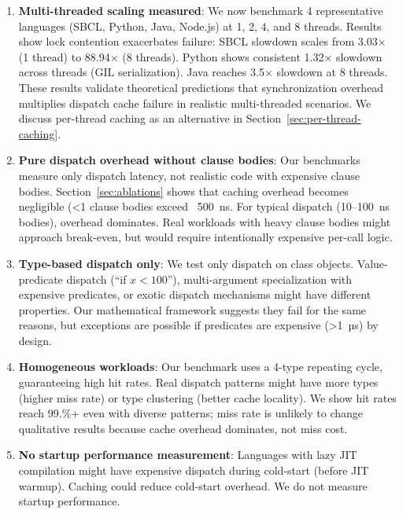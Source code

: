 \documentclass[sigplan,final,acmsmall,review,screen]{acmart}
\begin{document}
\begin{enumerate}
  \item \textbf{Multi-threaded scaling measured}: We now benchmark 4 representative languages (SBCL, Python, Java, Node.js) at 1, 2, 4, and 8 threads.
    Results show lock contention exacerbates failure: SBCL slowdown scales from 3.03× (1 thread) to 88.94× (8 threads).
    Python shows consistent 1.32× slowdown across threads (GIL serialization). Java reaches 3.5× slowdown at 8 threads.
    These results validate theoretical predictions that synchronization overhead multiplies dispatch cache failure in realistic multi-threaded scenarios.
    We discuss per-thread caching as an alternative in Section~\ref{sec:per-thread-caching}.

  \item \textbf{Pure dispatch overhead without clause bodies}: Our benchmarks measure only dispatch latency, not realistic code with
    expensive clause bodies. Section~\ref{sec:ablations} shows that caching overhead becomes negligible (<1%
    clause bodies exceed ~500~ns. For typical dispatch (10--100~ns bodies), overhead dominates. Real workloads with heavy
    clause bodies might approach break-even, but would require intentionally expensive per-call logic.

  \item \textbf{Type-based dispatch only}: We test only dispatch on class objects. Value-predicate dispatch
    (``if $x < 100$''), multi-argument specialization with expensive predicates, or exotic dispatch mechanisms
    might have different properties. Our mathematical framework suggests they fail for the same reasons, but exceptions
    are possible if predicates are expensive (>1~µs) by design.

  \item \textbf{Homogeneous workloads}: Our benchmark uses a 4-type repeating cycle, guaranteeing high hit rates.
    Real dispatch patterns might have more types (higher miss rate) or type clustering (better cache locality).
    We show hit rates reach 99.\%+ even with diverse patterns; miss rate is unlikely to change qualitative results
    because cache overhead dominates, not miss cost.

  \item \textbf{No startup performance measurement}: Languages with lazy JIT compilation might have expensive dispatch during cold-start
    (before JIT warmup). Caching could reduce cold-start overhead. We do not measure startup performance.


\end{enumerate}
\end{document}
